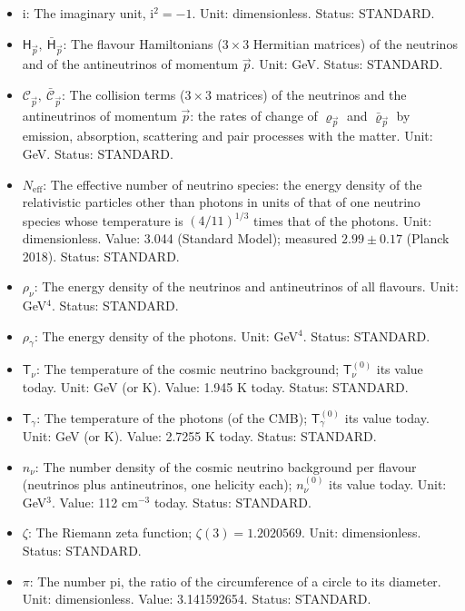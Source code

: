 \documentclass[
  10pt,
]{article}
\begin{document}
\begin{itemize}
  order, so that it obeys an equation of the same form. Unit:
  dimensionless. Status: STANDARD.
\item
  \(\mathrm{i}\): The imaginary unit, \(\mathrm{i}^2 = -1\). Unit:
  dimensionless. Status: STANDARD.
\item
  \(\mathsf{H}_{\vec p},\ \bar{\mathsf{H}}_{\vec p}\): The flavour
  Hamiltonians (\(3 \times 3\) Hermitian matrices) of the neutrinos and
  of the antineutrinos of momentum \(\vec p\). Unit: GeV. Status:
  STANDARD.
\item
  \(\mathcal{C}_{\vec p},\ \bar{\mathcal{C}}_{\vec p}\): The collision
  terms (\(3 \times 3\) matrices) of the neutrinos and the antineutrinos
  of momentum \(\vec p\): the rates of change of \(\varrho_{\vec p}\)
  and \(\bar\varrho_{\vec p}\) by emission, absorption, scattering and
  pair processes with the matter. Unit: GeV. Status: STANDARD.
\item
  \(N_{\mathrm{eff}}\): The effective number of neutrino species: the
  energy density of the relativistic particles other than photons in
  units of that of one neutrino species whose temperature is
  \((4/11)^{1/3}\) times that of the photons. Unit: dimensionless.
  Value: 3.044 (Standard Model); measured \(2.99 \pm 0.17\) (Planck
  2018). Status: STANDARD.
\item
  \(\rho_\nu\): The energy density of the neutrinos and antineutrinos of
  all flavours. Unit: GeV\(^4\). Status: STANDARD.
\item
  \(\rho_\gamma\): The energy density of the photons. Unit: GeV\(^4\).
  Status: STANDARD.
\item
  \(\mathsf{T}_\nu\): The temperature of the cosmic neutrino background;
  \(\mathsf{T}_\nu^{(0)}\) its value today. Unit: GeV (or K). Value:
  1.945 K today. Status: STANDARD.
\item
  \(\mathsf{T}_\gamma\): The temperature of the photons (of the CMB);
  \(\mathsf{T}_\gamma^{(0)}\) its value today. Unit: GeV (or K). Value:
  2.7255 K today. Status: STANDARD.
\item
  \(n_\nu\): The number density of the cosmic neutrino background per
  flavour (neutrinos plus antineutrinos, one helicity each);
  \(n_\nu^{(0)}\) its value today. Unit: GeV\(^3\). Value: 112
  cm\(^{-3}\) today. Status: STANDARD.
\item
  \(\zeta\): The Riemann zeta function; \(\zeta(3) = 1.2020569\). Unit:
  dimensionless. Status: STANDARD.
\item
  \(\pi\): The number pi, the ratio of the circumference of a circle to
  its diameter. Unit: dimensionless. Value: 3.141592654. Status:
  STANDARD.
\end{itemize}
\end{document}
